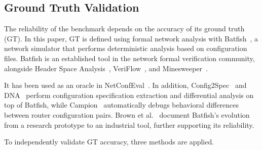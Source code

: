 

\subsection{Ground Truth Validation}

The reliability of the benchmark depends on the accuracy of its ground truth (GT).
In this paper, GT is defined using formal network analysis with Batfish~\cite{ref17}, a network simulator that performs deterministic analysis based on configuration files.
Batfish is an established tool in the network formal verification community, alongside Header Space Analysis~\cite{ref22}, VeriFlow~\cite{ref23}, and Minesweeper~\cite{ref24}.

It has been used as an oracle in NetConfEval~\cite{wang2024netconfeval}. In addition, Config2Spec~\cite{ref20} and DNA~\cite{ref25} perform configuration specification extraction and differential analysis on top of Batfish, while Campion~\cite{ref29} automatically debugs behavioral differences between router configuration pairs.
Brown et al.~\cite{ref32} document Batfish's evolution from a research prototype to an industrial tool, further supporting its reliability.

To independently validate GT accuracy, three methods are applied.




